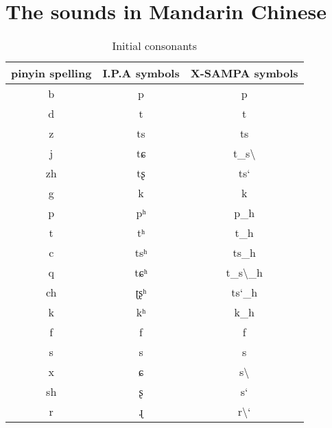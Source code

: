 \newcommand\ipa[1]{{\ipafont #1}}

\chapter[The sounds in Mandarin Chinese][The sounds in Mandarin Chinese]{The sounds in Mandarin Chinese}\label{app:mandarin_sounds}
\begin{table}[H]
\centering
\begin{tabular}{ccc}
\toprule
pinyin spelling & I.P.A symbols & X-SAMPA symbols \\
\midrule
b               &              \ipa{p} &                p \\
d               &              \ipa{t} &                t \\
z               &              \ipa{ts} &               ts  \\
j               &              \ipa{tɕ} &               t\_s\textbackslash  \\
zh              &              \ipa{tʂ} &               ts`  \\
g               &              \ipa{k} &                k \\
p               &              \ipa{pʰ} &               p\_h  \\
t               &              \ipa{tʰ} &               t\_h  \\
c               &              \ipa{tsʰ} &              ts\_h \\
q               &              \ipa{tɕʰ} &              t\_s\textbackslash\_h  \\
ch              &              \ipa{ʈʂʰ} &              ts`\_h   \\
k               &              \ipa{kʰ} &               k\_h  \\
f               &              \ipa{f} &                f \\
s               &              \ipa{s} &                s \\
x               &              \ipa{ɕ} &                s\textbackslash \\
sh              &              \ipa{ʂ} &                s` \\
r               &              \ipa{ɻ} &                r\textbackslash` \\
\bottomrule
\end{tabular}
\caption{Initial consonants}
\label{tab:app:initials}
\end{table}

